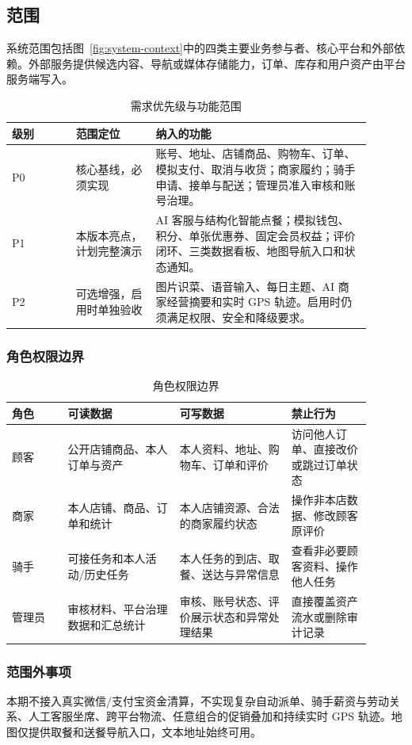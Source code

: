 \subsection{范围}

系统范围包括图~\ref{fig:system-context}中的四类主要业务参与者、核心平台和外部依赖。外部服务提供候选内容、导航或媒体存储能力，订单、库存和用户资产由平台服务端写入。


\begin{longtable}{|L{0.16\linewidth}|L{0.20\linewidth}|L{0.54\linewidth}|}
\caption{需求优先级与功能范围}\label{tab:scope}\\ \hline
\textbf{级别} & \textbf{范围定位} & \textbf{纳入的功能} \\ \hline
P0 & 核心基线，必须实现 & 账号、地址、店铺商品、购物车、订单、模拟支付、取消与收货；商家履约；骑手申请、接单与配送；管理员准入审核和账号治理。 \\ \hline
P1 & 本版本亮点，计划完整演示 & AI 客服与结构化智能点餐；模拟钱包、积分、单张优惠券、固定会员权益；评价闭环、三类数据看板、地图导航入口和状态通知。 \\ \hline
P2 & 可选增强，启用时单独验收 & 图片识菜、语音输入、每日主题、AI 商家经营摘要和实时 GPS 轨迹。启用时仍须满足权限、安全和降级要求。 \\ \hline
\end{longtable}

\subsubsection{角色权限边界}

\begin{longtable}{|L{0.14\linewidth}|L{0.28\linewidth}|L{0.28\linewidth}|L{0.20\linewidth}|}
\caption{角色权限边界}\label{tab:role-permission}\\ \hline
\textbf{角色} & \textbf{可读数据} & \textbf{可写数据} & \textbf{禁止行为} \\ \hline
顾客 & 公开店铺商品、本人订单与资产 & 本人资料、地址、购物车、订单和评价 & 访问他人订单、直接改价或跳过订单状态 \\ \hline
商家 & 本人店铺、商品、订单和统计 & 本人店铺资源、合法的商家履约状态 & 操作非本店数据、修改顾客原评价 \\ \hline
骑手 & 可接任务和本人活动/历史任务 & 本人任务的到店、取餐、送达与异常信息 & 查看非必要顾客资料、操作他人任务 \\ \hline
管理员 & 审核材料、平台治理数据和汇总统计 & 审核、账号状态、评价展示状态和异常处理结果 & 直接覆盖资产流水或删除审计记录 \\ \hline
\end{longtable}

\subsubsection{范围外事项}

本期不接入真实微信/支付宝资金清算，不实现复杂自动派单、骑手薪资与劳动关系、人工客服坐席、跨平台物流、任意组合的促销叠加和持续实时 GPS 轨迹。地图仅提供取餐和送餐导航入口，文本地址始终可用。
